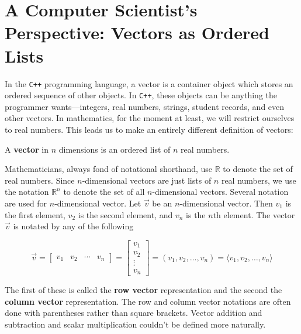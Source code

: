 \section{A Computer Scientist's Perspective: Vectors as Ordered Lists}

In the \verb|C++| programming language, a vector is a container object which stores an ordered sequence of other objects. In \verb|C++|, these objects can be anything the programmer wants---integers, real numbers, strings, student records, and even other vectors. In mathematics, for the moment at least, we will restrict ourselves to real numbers. This leads us to make an entirely different definition of vectors:

\begin{definition}
	A \textbf{vector} in $n$ dimensions is an ordered list of $n$ real numbers.
\end{definition}

Mathematicians, always fond of notational shorthand, use $\mathbb{R}$ to denote the set of real numbers. Since $n$-dimensional vectors are just lists of $n$ real numbers, we use the notation $\mathbb{R}^n$ to denote the set of all $n$-dimensional vectors. Several notation are used for $n$-dimensional vector. Let $\vec{v}$ be an $n$-dimensional vector. Then $v_1$ is the first element, $v_2$ is the second element, and $v_n$ is the $n$th element. The vector $\vec{v}$ is notated by any of the following

$$
\vec{v} = \begin{bmatrix} v_1 & v_2 & \cdots & v_n \end{bmatrix} = \begin{bmatrix} v_1 \\ v_2 \\ \vdots \\ v_n \end{bmatrix} = (v_1, v_2, \ldots, v_n) = \langle v_1, v_2, \ldots, v_n \rangle
$$

The first of these is called the \textbf{row vector} representation and the second the \textbf{column vector} representation. The row and column vector notations are often done with parentheses rather than square brackets. Vector addition and subtraction and scalar multiplication couldn't be defined more naturally.


